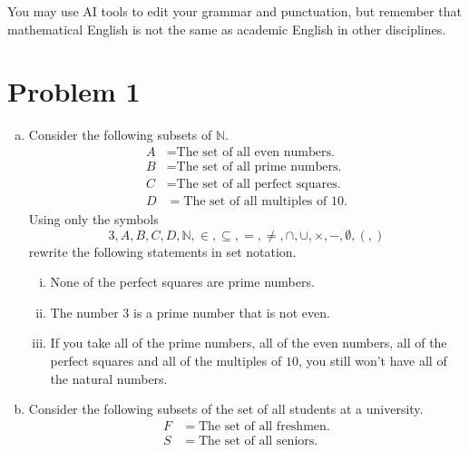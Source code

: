 \documentclass{article}
\theoremstyle{definition}
\begin{document}
You may use AI tools to edit your grammar and punctuation, but remember that mathematical English is not the same as academic English in other disciplines. 

\vfill

\newpage


\section*{Problem 1}
\begin{enumerate}[a)] %
    \item Consider the following subsets of $\mathbb{N}$.
    \begin{align*}
        A & = \text{The set of all even numbers.} \\
        B & = \text{The set of all prime numbers.} \\
        C & = \text{The set of all perfect squares.} \\
        D & = \text{The set of all multiples of }10.
    \end{align*}
    Using only the symbols $$3,A,B,C,D,\mathbb{N},\in,\subseteq,=,\neq,\cap,\cup,\times,-,\emptyset,(,)$$ rewrite the following statements in set notation.
    \begin{enumerate}[i.] %
        \item None of the perfect squares are prime numbers.
        \item The number $3$ is a prime number that is not even.
        \item If you take all of the prime numbers, all of the even numbers, all of the perfect squares and all of the multiples of $10$, you still won't have all of the natural numbers.
    \end{enumerate}
    \item Consider the following subsets of the set of all students at a university.
    \begin{align*}
        F & = \text{The set of all freshmen}. \\
        S & = \text{The set of all seniors}. \\

\end{align*}
\end{enumerate}
\end{document}
